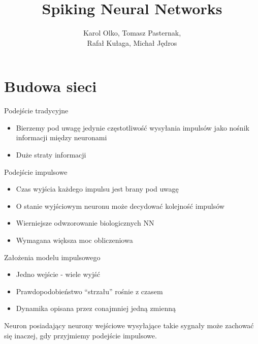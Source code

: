 \documentclass{beamer}
\author {Karol Olko, Tomasz Pasternak,\\ Rafał Kułaga, Michał Jędros}
\title {Spiking Neural Networks}
\begin{document}
\frame{\titlepage}
\frame{\tableofcontents}

\section{Budowa sieci}

\begin{frame}
  \begin{block}{Podejście tradycyjne}
    \begin{itemize}
    \item Bierzemy pod uwagę jedynie częstotliwość wysyłania impulsów jako nośnik informacji między neuronami
    \item Duże straty informacji
    \end{itemize}
  \end{block}
\end{frame}
\begin{frame}
  \begin{block}{Podejście impulsowe}
    \begin{itemize}
    \item<1-> Czas wyjścia każdego impulsu jest brany pod uwagę
    \item<2-> O stanie wyjściowym neuronu może decydować kolejność impulsów
    \item<3-> Wierniejsze odwzorowanie biologicznych NN
    \item<4-> Wymagana większa moc obliczeniowa
    \end{itemize}
  \end{block}
\end{frame}

\begin{frame}
  \begin{block}{Założenia modelu impulsowego}
    \begin{itemize}
    \item Jedno wejście - wiele wyjść
    \item Prawdopodobieństwo ``strzału'' rośnie z czasem
    \item Dynamika opisana przez conajmniej jedną zmienną
    \end{itemize}
  \end{block}
\end{frame}

\begin{frame}
  \begin{center}
  \end{center}
  Neuron posiadający neurony wejściowe wysyłające takie sygnały może zachować się inaczej, gdy przyjmiemy podejście impulsowe.
\end{frame}
\end{document}
